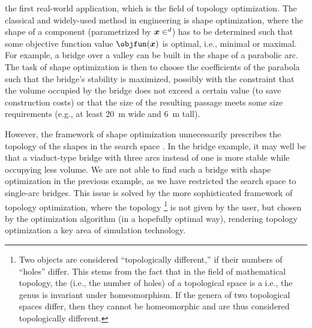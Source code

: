 
\label{chap:60topoOpt}

the first real-world application,
which is the field of topology optimization.
The classical and widely-used method in engineering is shape optimization,
where the shape of a component
(parametrized by $\*x \in \real^d$) has to be
determined such that some objective function value $\objfun(\*x)$ is optimal,
i.e., minimal or maximal.
For example, a bridge over a valley can be built in the shape of a
parabolic arc.
The task of shape optimization is then to choose the coefficients of the
parabola such that the bridge's stability is maximized,
possibly with the constraint that the volume occupied by the bridge
does not exceed a certain value (to save construction costs) or
that the size of the resulting passage meets some size requirements
(e.g., at least \SI{20}{\meter} wide and \SI{6}{\meter} tall).

However, the framework of shape optimization unnecessarily prescribes the
topology of the shapes in the search space \cite{Allaire16Towards}.
In the bridge example, it may well be that a viaduct-type bridge with
three arcs instead of one is more stable while occupying less volume.
We are not able to find such a bridge with shape optimization
in the previous example,
as we have restricted the search space to single-arc bridges.
This issue is solved by the more sophisticated
framework of topology optimization, where the topology%
\footnote{%
  Two objects are considered ``topologically different,''
  if their numbers of ``holes'' differ.
  This stems from the fact that in the field of mathematical topology,
  the  (i.e., the number of holes)
  of a topological space is a  i.e.,
  the genus is invariant under homeomorphism.
  If the genera of two topological spaces differ, then they cannot be
  homeomorphic and are thus considered topologically different.%
}
is not given by the user,
but chosen by the optimization algorithm (in a hopefully optimal way),
rendering topology optimization a key area of simulation technology.

